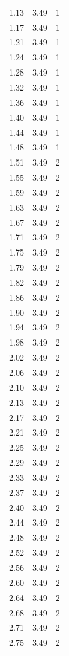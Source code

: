 \begin{longtable}{lrr}
  1.13 & 3.49 & 1 \\
  1.17 & 3.49 & 1 \\
  1.21 & 3.49 & 1 \\
  1.24 & 3.49 & 1 \\
  1.28 & 3.49 & 1 \\
  1.32 & 3.49 & 1 \\
  1.36 & 3.49 & 1 \\
  1.40 & 3.49 & 1 \\
  1.44 & 3.49 & 1 \\
  1.48 & 3.49 & 1 \\
  1.51 & 3.49 & 2 \\
  1.55 & 3.49 & 2 \\
  1.59 & 3.49 & 2 \\
  1.63 & 3.49 & 2 \\
  1.67 & 3.49 & 2 \\
  1.71 & 3.49 & 2 \\
  1.75 & 3.49 & 2 \\
  1.79 & 3.49 & 2 \\
  1.82 & 3.49 & 2 \\
  1.86 & 3.49 & 2 \\
  1.90 & 3.49 & 2 \\
  1.94 & 3.49 & 2 \\
  1.98 & 3.49 & 2 \\
  2.02 & 3.49 & 2 \\
  2.06 & 3.49 & 2 \\
  2.10 & 3.49 & 2 \\
  2.13 & 3.49 & 2 \\
  2.17 & 3.49 & 2 \\
  2.21 & 3.49 & 2 \\
  2.25 & 3.49 & 2 \\
  2.29 & 3.49 & 2 \\
  2.33 & 3.49 & 2 \\
  2.37 & 3.49 & 2 \\
  2.40 & 3.49 & 2 \\
  2.44 & 3.49 & 2 \\
  2.48 & 3.49 & 2 \\
  2.52 & 3.49 & 2 \\
  2.56 & 3.49 & 2 \\
  2.60 & 3.49 & 2 \\
  2.64 & 3.49 & 2 \\
  2.68 & 3.49 & 2 \\
  2.71 & 3.49 & 2 \\
  2.75 & 3.49 & 2 \\

\end{longtable}
